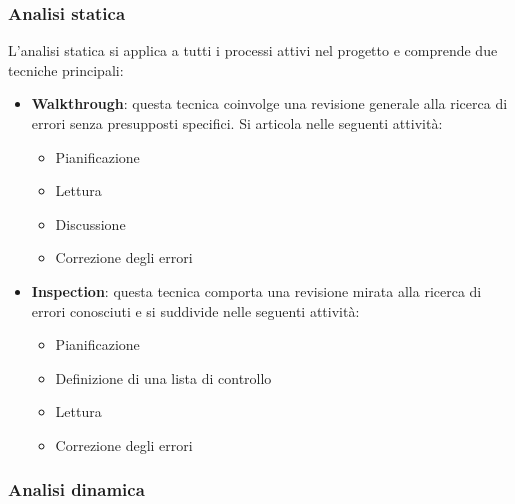 \subsubsection{Analisi statica}
L'analisi statica si applica a tutti i processi attivi nel progetto e comprende due tecniche principali:
\begin{itemize}
    \item \textbf{Walkthrough}: questa tecnica coinvolge una revisione generale alla ricerca di errori
    senza presupposti specifici. Si articola nelle seguenti attività:
    \begin{itemize}
        \item Pianificazione
        \item Lettura
        \item Discussione
        \item Correzione degli errori
    \end{itemize}
    \item \textbf{Inspection}: questa tecnica comporta una revisione mirata alla ricerca di errori conosciuti
    e si suddivide nelle seguenti attività:
    \begin{itemize}
        \item Pianificazione
        \item Definizione di una lista di controllo
        \item Lettura
        \item Correzione degli errori
    \end{itemize}
\end{itemize}
\subsubsection{Analisi dinamica}

